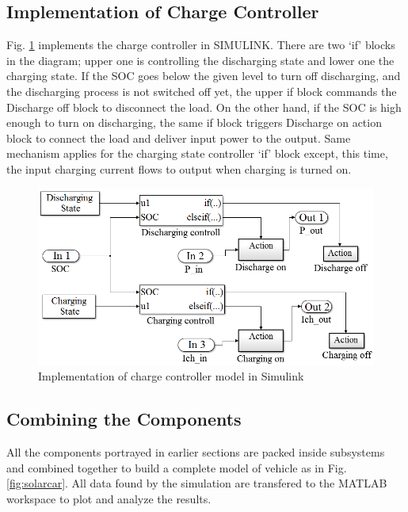 \documentclass[journal]{IEEEtran/IEEEtran}
\newcommand{\figref}[1]{Fig. \ref{#1}}
\begin{document}
	\subsection{Implementation of Charge Controller}
	\figref{fig:chargemask} implements the charge controller in SIMULINK. There are two ‘if’ blocks in the diagram; upper one is controlling the discharging state and lower one the charging state. If the SOC goes below the given level to turn off discharging, and the discharging process is not switched off yet, the upper if block commands the Discharge off block to disconnect the load. On the other hand, if the SOC is high enough to turn on discharging, the same if block triggers Discharge on action block to connect the load and deliver input power to the output. Same mechanism applies for the charging state controller ‘if’ block except, this time, the input charging current flows to output when charging is turned on.
	\begin{figure}[!tb]
		\centering
		\includegraphics[width=\linewidth]{charge_controller.png}
		\caption{Implementation of charge controller model in Simulink}
		\label{fig:chargemask}
	\end{figure}
	
	\subsection{Combining the Components}
	All the components portrayed in earlier sections are packed inside subsystems and combined together to build a complete model of vehicle as in \figref{fig:solarcar}. All data found by the simulation are transfered to the MATLAB workspace to plot and analyze the results.
	
\end{document}
